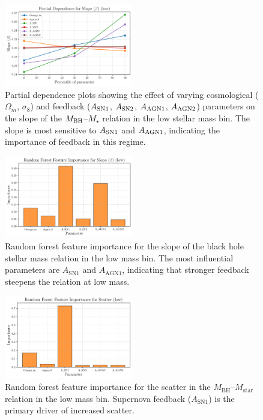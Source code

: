 \documentclass[twocolumn]{aastex631}
\begin{document}
\begin{figure}[ht!]
    \centering
    \includegraphics[width=0.5\textwidth]{../Project5/plots/pdp_Slope_beta_low_29_20250423_182536.png}
    \caption{Partial dependence plots showing the effect of varying cosmological ($\Omega_m$, $\sigma_8$) and feedback ($A_{\rm SN1}$, $A_{\rm SN2}$, $A_{\rm AGN1}$, $A_{\rm AGN2}$) parameters on the slope of the $M_{\rm BH}$–$M_{\star}$ relation in the low stellar mass bin. The slope is most sensitive to $A_{\rm SN1}$ and $A_{\rm AGN1}$, indicating the importance of feedback in this regime.
}
    \label{fig:pdp_slope_low}
\end{figure}

\begin{figure}[ht!]
    \centering
    \includegraphics[width=0.5\textwidth]{../Project5/plots/featimp_RandomForest_Slope_beta_low_27_20250423_182532.png}
    \caption{Random forest feature importance for the slope of the black hole stellar mass relation in the low mass bin. The most influential parameters are $A_\mathrm{SN1}$ and $A_\mathrm{AGN1}$, indicating that stronger feedback steepens the relation at low mass.
}
    \label{fig:featimp_slope_low}
\end{figure}

\begin{figure}[ht!]
    \centering
    \includegraphics[width=0.5\textwidth]{../Project5/plots/featimp_RandomForest_Scatter_low_33_20250423_182540.png}
    \caption{Random forest feature importance for the scatter in the $M_\mathrm{BH}$–$M_\mathrm{star}$ relation in the low mass bin. Supernova feedback ($A_\mathrm{SN1}$) is the primary driver of increased scatter.
}
    \label{fig:featimp_scatter_random_low}
\end{figure}
\end{document}
